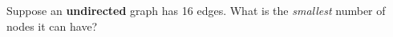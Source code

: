 \begin{prob}

    Suppose an \textbf{undirected} graph has 16 edges. What is the
    \emph{smallest} number of nodes it can have?



\end{prob}
